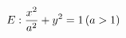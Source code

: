 \documentclass[preview]{standalone}
\begin{document}
\begin{align*}
\special{dvisvgm:raw <g id='unique000'>}E: \frac{x^2}{a^2} + y^2 = 1\,(a>1)\special{dvisvgm:raw </g>}
\end{align*}
\end{document}
